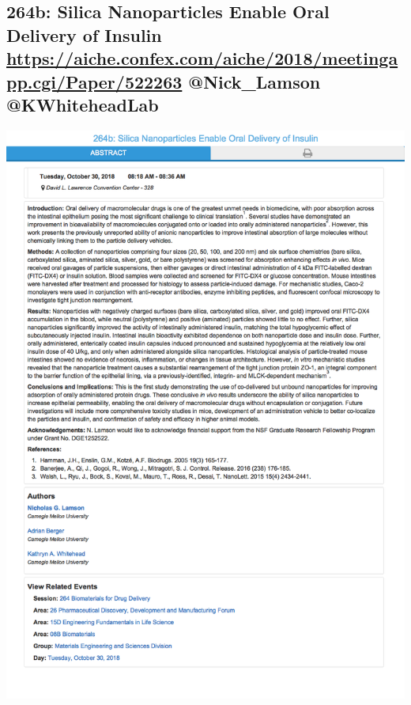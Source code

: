 \documentclass[11pt]{article}
\begin{document}
\subsection{264b: Silica Nanoparticles Enable Oral Delivery of Insulin  \url{https://aiche.confex.com/aiche/2018/meetingapp.cgi/Paper/522263}  @Nick\_Lamson @KWhiteheadLab}
\label{sec:orga91d73f}
\begin{center}
\includegraphics[width=.9\linewidth]{./522263.png}
\end{center}
\end{document}
